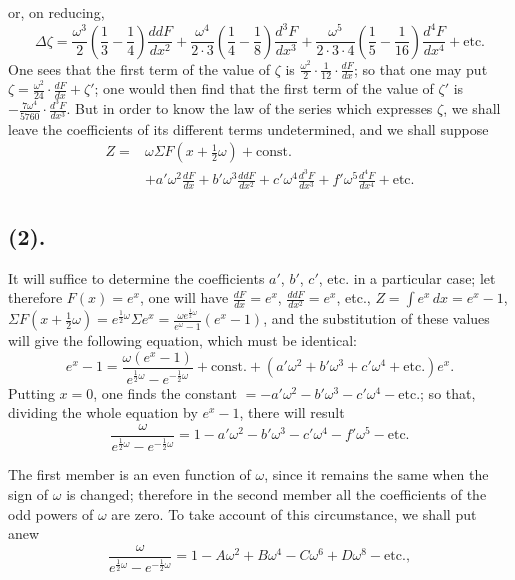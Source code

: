 \documentclass{article}
\begin{document}
or, on reducing,
\[ \Delta\zeta=\frac{\omega^{3}}{2}\left(\frac{1}{3}-\frac{1}{4}\right)\frac{ddF}{dx^{2}}+\frac{\omega^{4}}{2\cdot3}\left(\frac{1}{4}-\frac{1}{8}\right)\frac{d^{3}F}{dx^{3}}+\frac{\omega^{5}}{2\cdot3\cdot4}\left(\frac{1}{5}-\frac{1}{16}\right)\frac{d^{4}F}{dx^{4}}+\text{etc.} \]
One sees that the first term of the value of $\zeta$ is $\frac{\omega^{2}}{2}\cdot\frac{1}{12}\cdot\frac{dF}{dx}$; so that one may put $\zeta=\frac{\omega^{2}}{24}\cdot\frac{dF}{dx}+\zeta'$; one would then find that the first term of the value of $\zeta'$ is $-\frac{7\omega^{4}}{5760}\cdot\frac{d^{3}F}{dx^{3}}$. But in order to know the law of the series which expresses $\zeta$, we shall leave the coefficients of its different terms undetermined, and we shall suppose
\[ \begin{aligned} Z={}&\omega\Sigma F(x+\tfrac{1}{2}\omega)+\text{const.}\\ &+a'\omega^{2}\frac{dF}{dx}+b'\omega^{3}\frac{ddF}{dx^{2}}+c'\omega^{4}\frac{d^{3}F}{dx^{3}}+f'\omega^{5}\frac{d^{4}F}{dx^{4}}+\text{etc.} \end{aligned} \]

\subsection*{(2).}

It will suffice to determine the coefficients $a'$, $b'$, $c'$, etc. in a particular case; let therefore $F(x)=e^{x}$, one will have $\frac{dF}{dx}=e^{x}$, $\frac{ddF}{dx^{2}}=e^{x}$, etc., $\displaystyle Z=\int e^{x}\,dx=e^{x}-1$, $\Sigma F(x+\frac{1}{2}\omega)=e^{\frac{1}{2}\omega}\Sigma e^{x}=\frac{\omega e^{\frac{1}{2}\omega}}{e^{\omega}-1}(e^{x}-1)$, and the substitution of these values will give the following equation, which must be identical:
\[ e^{x}-1=\frac{\omega(e^{x}-1)}{e^{\frac{1}{2}\omega}-e^{-\frac{1}{2}\omega}}+\text{const.}+(a'\omega^{2}+b'\omega^{3}+c'\omega^{4}+\text{etc.})e^{x}. \]
Putting $x=0$, one finds the constant $=-a'\omega^{2}-b'\omega^{3}-c'\omega^{4}-\text{etc.}$; so that, dividing the whole equation by $e^{x}-1$, there will result
\[ \frac{\omega}{e^{\frac{1}{2}\omega}-e^{-\frac{1}{2}\omega}}=1-a'\omega^{2}-b'\omega^{3}-c'\omega^{4}-f'\omega^{5}-\text{etc.} \]

The first member is an even function of $\omega$, since it remains the same when the sign of $\omega$ is changed; therefore in the second member all the coefficients of the odd powers of $\omega$ are zero. To take account of this circumstance, we shall put anew
\[ \frac{\omega}{e^{\frac{1}{2}\omega}-e^{-\frac{1}{2}\omega}}=1-A\omega^{2}+B\omega^{4}-C\omega^{6}+D\omega^{8}-\text{etc.}, \tag{1} \]
\end{document}
